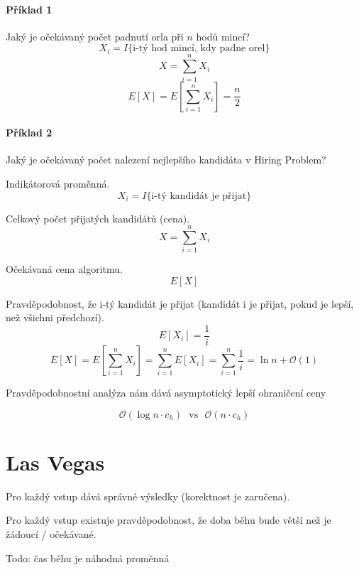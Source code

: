 \paragraph*{Příklad 1} Jaký je očekávaný počet padnutí orla při $n$ hodů mincí?
$$ X_i = I\{ \text{i-tý hod mincí, kdy padne orel} \}$$
$$ X = \sum_{i=1}^n X_i$$
$$ E[X] = E \left[ \sum_{i=1}^n X_i \right] = \frac{n}{2}$$

\paragraph*{Příklad 2} Jaký je očekávaný počet nalezení nejlepšího kandidáta v Hiring Problem? \begin{compactitem}
    \item Indikátorová proměnná.
    $$ X_i = I\{ \text{i-tý kandidát je přijat} \}$$

    \item Celkový počet přijatých kandidátů (cena).
    $$ X = \sum_{i=1}^n X_i$$

    \item Očekávaná cena algoritmu.
    $$ E[X] $$

    \item Pravděpodobnost, že i-tý kandidát je přijat (kandidát i je přijat, pokud je lepší, než všichni předchozí).
    $$ E[X_i] = \frac{1}{i}$$
    $$ E[X] = E \left[ \sum_{i=1}^n X_i \right] = \sum_{i=1}^n E \left[ X_i \right] = \sum_{i=1}^n \frac{1}{i} = \ln{n} + \mathcal{O}(1)$$

    \item Pravděpodobnostní analýza nám dává asymptotický lepší ohraničení ceny

    $$ \mathcal{O}(\log{n} \cdot c_h) ~~~\text{vs}~~~ \mathcal{O}(n \cdot c_h)$$

\end{compactitem}


\section{Las Vegas}

\begin{compactitem}
    \item Pro každý vstup dává správné výsledky (korektnost je zaručena).

    \item Pro každý vstup existuje pravděpodobnost, že doba běhu bude větší než je žádoucí / očekávané.

    \item Todo: čas běhu je náhodná proměnná
\end{compactitem}

